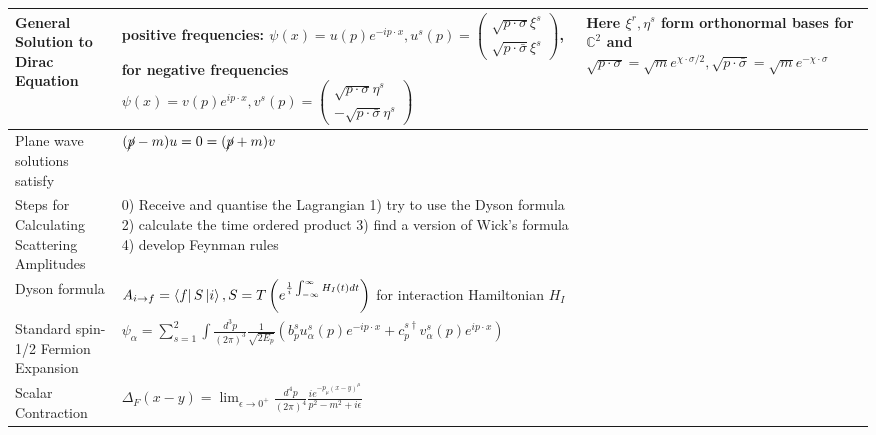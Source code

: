 \documentclass{article}
\theoremstyle{definition}
\begin{document}
\begin{table}[H]
\begin{adjustbox}{center}
\begin{tabular}{|p{5cm}|p{10cm}|p{5cm}|}
      General Solution to Dirac Equation &
      positive frequencies: $\psi(x) = u(p) e^{-i p \cdot x}, u^s(p) = \begin{pmatrix} \sqrt{p \cdot \sigma} \xi^s \\ \sqrt{p \cdot \bar{\sigma}} \xi^s \end{pmatrix}$,
      for negative frequencies $\psi(x) = v(p) e^{ip \cdot x}, v^s(p) = \begin{pmatrix} \sqrt{p \cdot \sigma} \eta^s \\ -\sqrt{p \cdot \bar{\sigma}} \eta^s \end{pmatrix}$ &
      Here $\xi^r, \eta^s$ form orthonormal bases for $\mathbb{C}^2$ and
      $\sqrt{p \cdot \sigma} = \sqrt{m} e^{\chi \cdot \sigma / 2}, \sqrt{p \cdot \bar{\sigma}} = \sqrt{m} e^{-\chi \cdot \sigma}$ \\ \hline
      Plane wave solutions satisfy & $(\cancel{p} - m)u = 0 = (\cancel{p} + m)v$ & \\ \hline
      Steps for Calculating Scattering Amplitudes & 0) Receive and quantise the Lagrangian 1) try to use the Dyson formula 2) calculate the time ordered product 3) find a version of Wick's formula 4) develop Feynman rules & \\ \hline
      Dyson formula & $A_{i \to f} = \bra{f} S \ket{i}, S = T\left( e^{\frac{1}{i} \int_{-\infty}^\infty H_I(t) dt} \right)$ for interaction Hamiltonian $H_I$ & \\ \hline
      Standard spin-1/2 Fermion Expansion & $\psi_\alpha = \sum_{s = 1}^2 \int \frac{d^3p}{(2\pi)^3}
                                            \frac{1}{\sqrt{2 E_p}} \left( b_p^s u_\alpha^s(p) e^{-ip \cdot x} +
                                            c_p^{s \dagger} v_\alpha^s(p) e^{ip \cdot x} \right)$ & \\ \hline
      Scalar Contraction & $ \Delta_F(x - y) = \lim_{\epsilon \to 0^+}
                           \frac{d^4p}{(2\pi)^4} \frac{i e^{-p_\mu (x - y)^\mu}}{p^2 - m^2 + i\epsilon}$ & \\ \hline
    \end{tabular}
  \end{adjustbox}
\end{table}
\end{document}
